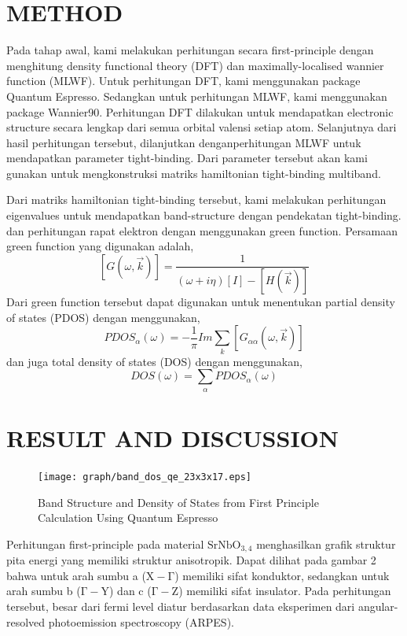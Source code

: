 \documentclass{aip-cp}
\begin{document}
\section{METHOD}
Pada tahap awal, kami melakukan perhitungan secara first-principle dengan menghitung density functional theory (DFT) dan maximally-localised wannier function (MLWF). Untuk perhitungan DFT, kami menggunakan package Quantum Espresso\cite{QE-2017,QE-2009}. Sedangkan untuk perhitungan MLWF, kami menggunakan package Wannier90\cite{wannier}. Perhitungan DFT dilakukan untuk mendapatkan electronic structure secara lengkap dari semua orbital valensi setiap atom. Selanjutnya dari hasil perhitungan tersebut, dilanjutkan denganperhitungan MLWF untuk mendapatkan parameter tight-binding. Dari parameter tersebut akan kami gunakan untuk mengkonstruksi matriks hamiltonian tight-binding multiband.

Dari matriks hamiltonian tight-binding tersebut, kami melakukan perhitungan eigenvalues untuk mendapatkan band-structure dengan pendekatan tight-binding. dan perhitungan rapat elektron dengan menggunakan green function. Persamaan green function yang digunakan adalah,
$$ [G(\omega, \vec{k})] = \frac{1}{(\omega + i\eta)[I] - [H(\vec{k})]} $$
Dari green function tersebut dapat digunakan untuk menentukan partial density of states (PDOS) dengan menggunakan,
$$ PDOS_\alpha(\omega) = -\frac{1}{\pi}Im\sum_k{[G_{\alpha \alpha}(\omega, \vec{k})]} $$
dan juga total density of states (DOS) dengan menggunakan,
$$ DOS (\omega) = \sum_\alpha{PDOS_\alpha(\omega)}$$


\section{RESULT AND DISCUSSION}
\begin{figure}[h]
  \centerline{\texttt{[image: graph/band\_dos\_qe\_23x3x17.eps]}}
  \caption{Band Structure and Density of States from First Principle Calculation Using Quantum Espresso}
\end{figure}

Perhitungan first-principle pada material $\mathrm{SrNbO_{3,4}}$ menghasilkan grafik struktur pita energi yang memiliki struktur anisotropik. Dapat dilihat pada gambar 2 bahwa untuk arah sumbu a ($\mathrm{X - \Gamma}$) memiliki sifat konduktor, sedangkan untuk arah sumbu b ($\mathrm{\Gamma - Y}$) dan c ($\mathrm{\Gamma-Z}$) memiliki sifat insulator. Pada perhitungan tersebut, besar dari fermi level diatur berdasarkan data eksperimen dari angular-resolved photoemission spectroscopy (ARPES)\cite{kuntscher}.
\end{document}
